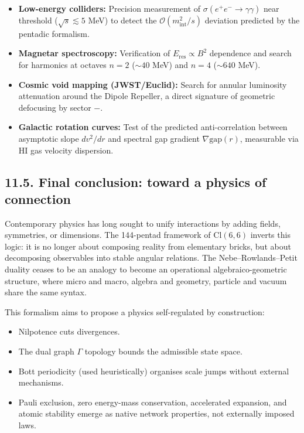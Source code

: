 \documentclass[11pt]{article}
\providecommand{\tightlist}{\setlength{\itemsep}{2pt}\setlength{\parskip}{6pt}}
\let\oldmathcal\mathcal
\renewcommand{\mathcal}[1]{\oldmathcal{#1}}
\providecommand{\tightlist}{%
  \setlength{\itemsep}{2pt}\setlength{\parskip}{6pt}
}
\begin{document}
\begin{itemize}
\tightlist
\item
  \textbf{Low-energy colliders:} Precision measurement of
  \(\sigma(e^+e^- \to \gamma\gamma)\) near threshold
  (\(\sqrt{s} \lesssim 5\) MeV) to detect the
  \(\mathcal{O}(m_{\text{int}}^2/s)\) deviation predicted by the
  pentadic formalism.
\item
  \textbf{Magnetar spectroscopy:} Verification of
  \(E_{\text{res}} \propto B^2\) dependence and search for harmonics at
  octaves \(n=2\) (\(\sim 40\) MeV) and \(n=4\) (\(\sim 640\) MeV).
\item
  \textbf{Cosmic void mapping (JWST/Euclid):} Search for annular
  luminosity attenuation around the Dipole Repeller, a direct signature
  of geometric defocusing by sector \(-\).
\item
  \textbf{Galactic rotation curves:} Test of the predicted
  anti-correlation between asymptotic slope \(dv^2/dr\) and spectral gap
  gradient \(\nabla \text{gap}(r)\), measurable via HI gas velocity
  dispersion.
\end{itemize}

\hypertarget{final-conclusion-toward-a-physics-of-connection}{%
\subsection{11.5. Final conclusion: toward a physics of
connection}\label{final-conclusion-toward-a-physics-of-connection}}

Contemporary physics has long sought to unify interactions by adding
fields, symmetries, or dimensions. The 144-pentad framework of
\(\text{Cl}(6,6)\) inverts this logic: it is no longer about composing
reality from elementary bricks, but about decomposing observables into
stable angular relations. The Nebe--Rowlands--Petit duality ceases to be
an analogy to become an operational algebraico-geometric structure,
where micro and macro, algebra and geometry, particle and vacuum share
the same syntax.

This formalism aims to propose a physics self-regulated by construction:

\begin{itemize}
    \item Nilpotence cuts divergences.
    \item The dual graph $\Gamma$ topology bounds the admissible state space.
    \item Bott periodicity (used heuristically) organises scale jumps without external mechanisms.
    \item Pauli exclusion, zero energy-mass conservation, accelerated expansion, and atomic stability emerge as native network properties, not externally imposed laws.
\end{itemize}
\end{document}
